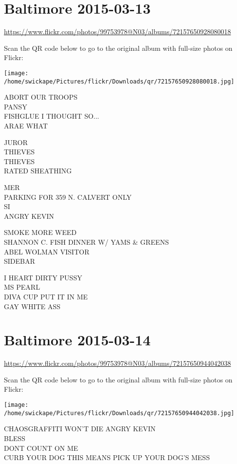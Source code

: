 \documentclass[10pt,letterpaper]{article}
\begin{document}
\section*{Baltimore 2015-03-13}

\url{https://www.flickr.com/photos/99753978@N03/albums/72157650928080018}

Scan the QR code below to go to the original album with full-size photos on Flickr:

\texttt{[image: /home/swickape/Pictures/flickr/Downloads/qr/72157650928080018.jpg]}


ABORT OUR TROOPS\\
PANSY\\
FISHGLUE I THOUGHT SO...\\
ARAE WHAT

JUROR\\
THIEVES\\
THIEVES\\
RATED SHEATHING

MER\\
PARKING FOR 359 N. CALVERT ONLY\\
SI\\
ANGRY KEVIN

SMOKE MORE WEED\\
SHANNON C. FISH DINNER W/ YAMS \& GREENS\\
ABEL WOLMAN VISITOR\\
SIDEBAR

I HEART DIRTY PUSSY\\
MS PEARL\\
DIVA CUP PUT IT IN ME\\
GAY WHITE ASS


\section*{Baltimore 2015-03-14}

\url{https://www.flickr.com/photos/99753978@N03/albums/72157650944042038}

Scan the QR code below to go to the original album with full-size photos on Flickr:

\texttt{[image: /home/swickape/Pictures/flickr/Downloads/qr/72157650944042038.jpg]}


CHAOSGRAFFITI WON'T DIE ANGRY KEVIN\\
BLESS\\
DONT COUNT ON ME\\
CURB YOUR DOG THIS MEANS PICK UP YOUR DOG'S MESS
\end{document}
